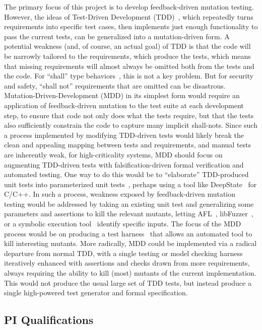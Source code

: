 The primary focus of this project is to develop feedback-driven mutation testing.  However, the ideas of Test-Driven Development (TDD)~\cite{TDD,TDDFuture}, which repeatedly turns requirements into specific test cases, then implements just enough functionality to pass the current tests, can be generalized into a mutation-driven form.  A potential weakness (and, of course, an actual goal) of TDD is that the code will be narrowly tailored to the requirements, which produce the tests, which means that missing requirements will almost always be omitted both from the tests and the code.  For ``shall'' type behaviors~\cite{INCOSE}, this is not a key problem.  But for security and safety, ``shall not'' requirements that are omitted can be disastrous.  Mutation-Driven-Development (MDD) in its simplest form would require an application of feedback-driven mutation to the test suite at each development step, to ensure that code not only does what the tests require, but that the tests also sufficiently constrain the code to capture many implicit shall-nots.  Since such a process implemented by modifying TDD-driven tests would likely break the clean and appealing mapping between tests and requirements, and manual tests are inherently weak, for high-criticality systems, MDD should focus on augmenting TDD-driven tests with falsification-driven formal verification and automated testing.  One way to do this would be to ``elaborate'' TDD-produced unit tests into parameterized unit tests~\cite{UnitMeister,ParamUnit}, perhaps using a tool like DeepState~\cite{DeepState} for C/C++.  In such a process, weakness exposed by feedback-driven mutation testing would be addressed by taking an existing unit test and generalizing some parameters and assertions to kill the relevant mutants, letting AFL~\cite{aflfuzz}, libFuzzer~\cite{libfuzzer}, or a symbolic execution tool~\cite{angr1,angr2,manticore} identify specific inputs.  The focus of the MDD process would be on producing a test harness~\cite{WODACommon,tstlsttt} that allows an automated tool to kill interesting mutants.  More radically, MDD could be implemented via a radical departure from normal TDD, with a single testing or model checking harness iteratively enhanced with assertions and checks drawn from more requirements, always requiring the ability to kill (most) mutants of the current implementation.  This would not produce the usual large set of TDD tests, but instead produce a single high-powered test generator and formal specification.

\subsection{PI Qualifications}

